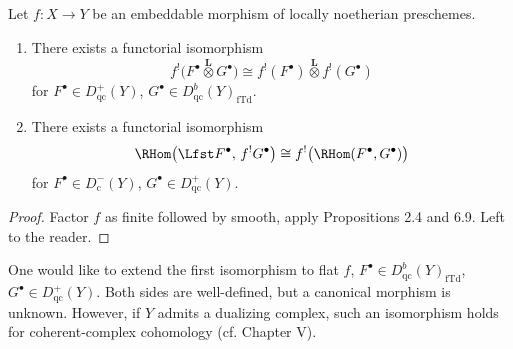 \setcounter{page}{194}
\begin{proposition}
Let \(f\colon X\to Y\) be an embeddable morphism of locally noetherian preschemes.
\begin{enumerate}
\item There exists a functorial isomorphism
\[
f^!\big(F^\bullet \stackrel{\mathbf{L}}{\otimes} G^\bullet\big)
\cong f^!(F^\bullet) \stackrel{\mathbf{L}}{\otimes} f^!(G^\bullet)
\]
for \(F^\bullet\in D_{\mathrm{qc}}^+(Y)\), \(G^\bullet\in D_{\mathrm{qc}}^b(Y)_{\mathrm{fTd}}\).

\item There exists a functorial isomorphism
\[
\RHom\big(\Lfst F^\bullet,\,f^! G^\bullet\big)
\cong f^!\big(\RHom(F^\bullet,G^\bullet)\big)
\]
for \(F^\bullet\in D_{\mathrm{c}}^-(Y)\), \(G^\bullet\in D_{\mathrm{qc}}^+(Y)\).
\end{enumerate}
\end{proposition}

\begin{proof}
Factor \(f\) as finite followed by smooth, apply Propositions 2.4 and 6.9. Left to the reader.
\end{proof}

\begin{remark}
One would like to extend the first isomorphism to flat \(f\), \(F^\bullet\in D_{\mathrm{qc}}^b(Y)_{\mathrm{fTd}}\), \(G^\bullet\in D_{\mathrm{qc}}^+(Y)\). Both sides are well-defined, but a canonical morphism is unknown. However, if \(Y\) admits a dualizing complex, such an isomorphism holds for coherent-complex cohomology (cf. Chapter V).
\end{remark}
